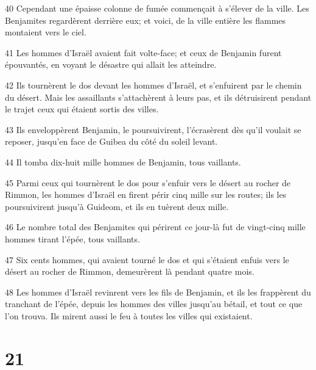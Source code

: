 \par 40 Cependant une épaisse colonne de fumée commençait à s'élever de la ville. Les Benjamites regardèrent derrière eux; et voici, de la ville entière les flammes montaient vers le ciel.
\par 41 Les hommes d'Israël avaient fait volte-face; et ceux de Benjamin furent épouvantés, en voyant le désastre qui allait les atteindre.
\par 42 Ils tournèrent le dos devant les hommes d'Israël, et s'enfuirent par le chemin du désert. Mais les assaillants s'attachèrent à leurs pas, et ils détruisirent pendant le trajet ceux qui étaient sortis des villes.
\par 43 Ils enveloppèrent Benjamin, le poursuivirent, l'écrasèrent dès qu'il voulait se reposer, jusqu'en face de Guibea du côté du soleil levant.
\par 44 Il tomba dix-huit mille hommes de Benjamin, tous vaillants.
\par 45 Parmi ceux qui tournèrent le dos pour s'enfuir vers le désert au rocher de Rimmon, les hommes d'Israël en firent périr cinq mille sur les routes; ils les poursuivirent jusqu'à Guideom, et ils en tuèrent deux mille.
\par 46 Le nombre total des Benjamites qui périrent ce jour-là fut de vingt-cinq mille hommes tirant l'épée, tous vaillants.
\par 47 Six cents hommes, qui avaient tourné le dos et qui s'étaient enfuis vers le désert au rocher de Rimmon, demeurèrent là pendant quatre mois.
\par 48 Les hommes d'Israël revinrent vers les fils de Benjamin, et ils les frappèrent du tranchant de l'épée, depuis les hommes des villes jusqu'au bétail, et tout ce que l'on trouva. Ils mirent aussi le feu à toutes les villes qui existaient.

\chapter{21}

